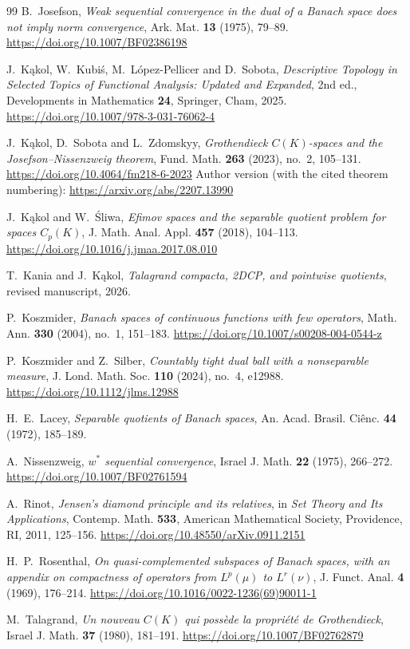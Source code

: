 \documentclass[a4paper,11pt]{amsart}
\theoremstyle{plain}
\theoremstyle{definition}
\theoremstyle{remark}
\numberwithin{equation}{section}
\begin{document}
\begin{thebibliography}{99}
B.~Josefson,
\emph{Weak sequential convergence in the dual of a Banach space does not imply norm convergence},
Ark. Mat. \textbf{13} (1975), 79--89.
\url{https://doi.org/10.1007/BF02386198}

J.~K\k{a}kol, W.~Kubi\'s, M.~L\'opez-Pellicer and D.~Sobota,
\emph{Descriptive Topology in Selected Topics of Functional Analysis:
Updated and Expanded}, 2nd ed., Developments in Mathematics \textbf{24},
Springer, Cham, 2025.
\url{https://doi.org/10.1007/978-3-031-76062-4}

J.~K\k{a}kol, D.~Sobota and L.~Zdomskyy,
\emph{Grothendieck $C(K)$-spaces and the Josefson--Nissenzweig theorem},
Fund. Math. \textbf{263} (2023), no.~2, 105--131.
\url{https://doi.org/10.4064/fm218-6-2023}
Author version (with the cited theorem numbering):
\url{https://arxiv.org/abs/2207.13990}

J.~K\k{a}kol and W.~\'Sliwa,
\emph{Efimov spaces and the separable quotient problem for spaces $C_p(K)$},
J. Math. Anal. Appl. \textbf{457} (2018), 104--113.
\url{https://doi.org/10.1016/j.jmaa.2017.08.010}

T.~Kania and J.~K\k{a}kol,
\emph{Talagrand compacta, 2DCP, and pointwise quotients},
revised manuscript, 2026.

P.~Koszmider,
\emph{Banach spaces of continuous functions with few operators},
Math. Ann. \textbf{330} (2004), no.~1, 151--183.
\url{https://doi.org/10.1007/s00208-004-0544-z}

P.~Koszmider and Z.~Silber,
\emph{Countably tight dual ball with a nonseparable measure},
J. Lond. Math. Soc. \textbf{110} (2024), no.~4, e12988.
\url{https://doi.org/10.1112/jlms.12988}

H.~E.~Lacey,
\emph{Separable quotients of Banach spaces},
An. Acad. Brasil. Ci\^enc. \textbf{44} (1972), 185--189.

A.~Nissenzweig,
\emph{$w^*$ sequential convergence},
Israel J. Math. \textbf{22} (1975), 266--272.
\url{https://doi.org/10.1007/BF02761594}

A.~Rinot,
\emph{Jensen's diamond principle and its relatives},
in \emph{Set Theory and Its Applications},
Contemp. Math. \textbf{533}, American Mathematical Society, Providence, RI, 2011, 125--156.
\url{https://doi.org/10.48550/arXiv.0911.2151}

H.~P.~Rosenthal,
\emph{On quasi-complemented subspaces of Banach spaces, with an appendix on compactness of operators from $L^p(\mu)$ to $L^r(\nu)$},
J. Funct. Anal. \textbf{4} (1969), 176--214.
\url{https://doi.org/10.1016/0022-1236(69)90011-1}

M.~Talagrand,
\emph{Un nouveau $C(K)$ qui poss\`ede la propri\'{e}t\'{e} de Grothendieck},
Israel J. Math. \textbf{37} (1980), 181--191.
\url{https://doi.org/10.1007/BF02762879}

\end{thebibliography}
\end{document}
